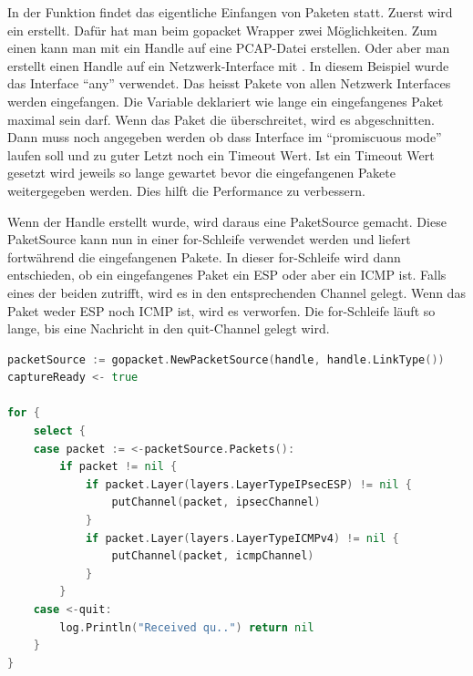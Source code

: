 In der  Funktion findet das eigentliche Einfangen von Paketen statt. Zuerst wird ein  erstellt. Dafür hat man beim gopacket Wrapper zwei Möglichkeiten. Zum einen kann man mit  ein Handle auf eine \ac{PCAP}-Datei erstellen. Oder aber man erstellt einen Handle auf ein Netzwerk-Interface mit . In diesem Beispiel wurde das Interface \enquote{any} verwendet. Das heisst Pakete von allen Netzwerk Interfaces werden eingefangen. Die  Variable deklariert wie lange ein eingefangenes Paket maximal sein darf. Wenn das Paket die  überschreitet, wird es abgeschnitten. Dann muss noch angegeben werden ob dass Interface im \enquote{promiscuous mode} laufen soll und zu guter Letzt noch ein Timeout Wert. Ist ein Timeout Wert gesetzt wird jeweils so lange gewartet bevor die eingefangenen Pakete weitergegeben werden. Dies hilft die Performance zu verbessern.

Wenn der Handle erstellt wurde, wird daraus eine PaketSource gemacht. Diese PaketSource kann nun in einer for-Schleife verwendet werden und liefert fortwährend die eingefangenen Pakete. In dieser for-Schleife wird dann entschieden, ob ein eingefangenes Paket ein \ac{ESP} oder aber ein \ac{ICMP} ist. Falls eines der beiden zutrifft, wird es in den entsprechenden Channel gelegt. Wenn das Paket weder \ac{ESP} noch \ac{ICMP} ist, wird es verworfen. Die for-Schleife läuft so lange, bis eine Nachricht in den quit-Channel gelegt wird.

\begin{lstlisting}[language=go, caption=Einfangen und Verteilen von Paketen]    
packetSource := gopacket.NewPacketSource(handle, handle.LinkType())
captureReady <- true

for {
	select {
	case packet := <-packetSource.Packets():
		if packet != nil {
			if packet.Layer(layers.LayerTypeIPsecESP) != nil {
				putChannel(packet, ipsecChannel)
			}
			if packet.Layer(layers.LayerTypeICMPv4) != nil {
				putChannel(packet, icmpChannel)
			}
		}
	case <-quit:
		log.Println("Received qu..") return nil
	}
}
\end{lstlisting}